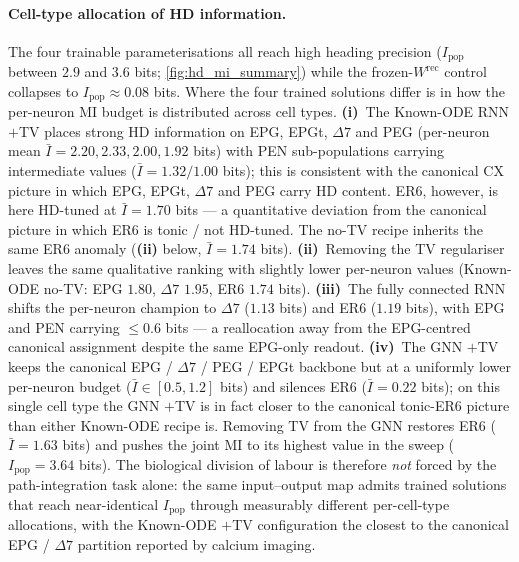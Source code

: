 \documentclass[11pt]{article}
\begin{document}
\paragraph{Cell-type allocation of HD information.}
The four trainable parameterisations all reach high heading
precision ($I_{\mathrm{pop}}$ between $2.9$ and $3.6$ bits;
\cref{fig:hd_mi_summary}) while the frozen-$W^{\mathrm{rec}}$
control collapses to $I_{\mathrm{pop}} \approx 0.08$ bits.
Where the four trained solutions differ is in how the per-neuron
MI budget is distributed across cell types.
\textbf{(i)}~The Known-ODE RNN $+$TV places strong HD information
on EPG, EPGt, $\Delta 7$ and PEG (per-neuron mean $\bar I = 2.20,
2.33, 2.00, 1.92$ bits) with PEN sub-populations carrying
intermediate values ($\bar I = 1.32 / 1.00$ bits); this is
consistent with the canonical CX picture
\citep{seelig2015,kim2017,green2017} in which EPG, EPGt, $\Delta
7$ and PEG carry HD content. ER6, however, is here HD-tuned at
$\bar I = 1.70$ bits --- a quantitative deviation from the
canonical picture in which ER6 is tonic / not HD-tuned. The
no-TV recipe inherits the same ER6 anomaly
(\textbf{(ii)} below, $\bar I = 1.74$ bits).
\textbf{(ii)}~Removing the TV regulariser leaves the same
qualitative ranking with slightly lower per-neuron values
(Known-ODE no-TV: EPG $1.80$, $\Delta 7$ $1.95$, ER6 $1.74$ bits).
\textbf{(iii)}~The fully connected RNN shifts the per-neuron
champion to $\Delta 7$ ($1.13$ bits) and ER6 ($1.19$ bits), with
EPG and PEN carrying $\le 0.6$ bits --- a reallocation away from
the EPG-centred canonical assignment despite the same EPG-only
readout. \textbf{(iv)}~The GNN $+$TV keeps the canonical
EPG / $\Delta 7$ / PEG / EPGt backbone but at a uniformly lower
per-neuron budget ($\bar I \in [0.5, 1.2]$ bits) and silences ER6
($\bar I = 0.22$ bits); on this single cell type the GNN $+$TV is
in fact closer to the canonical tonic-ER6 picture than either
Known-ODE recipe is. Removing TV from the GNN restores ER6
($\bar I = 1.63$ bits) and pushes the joint MI to its highest value
in the sweep ($I_{\mathrm{pop}} = 3.64$ bits). The biological
division of labour is therefore \emph{not} forced by the
path-integration task alone: the same input--output map admits
trained solutions that reach near-identical $I_{\mathrm{pop}}$
through measurably different per-cell-type allocations, with the
Known-ODE $+$TV configuration the closest to the canonical
EPG / $\Delta 7$ partition reported by calcium imaging.
\end{document}
